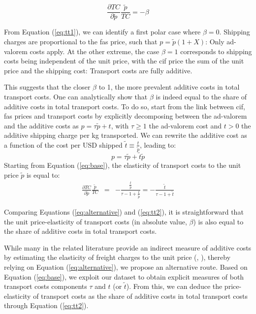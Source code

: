 \documentclass[a4paper,11pt]{article}
\begin{document}
\begin{equation}
\frac{\partial TC}{\partial \widetilde{p}} \frac{\widetilde{p}}{TC} = - \beta \label{eq:alternative}
\end{equation}

From Equation (\ref{eq:tt1}), we can identify a first polar case where $\beta=0$. Shipping charges are proportional to the fas price, such that $p=\widetilde{p}(1+X)$: Only ad-valorem costs apply. At the other extreme, the case $\beta=1$ corresponds to shipping costs being independent of the unit price, with the cif price the sum of the unit price and the shipping cost: Transport costs are fully additive.

This suggests that the closer $\beta$ to 1, the more prevalent additive costs in total transport costs. One can analytically show that $\beta$ is indeed equal to the share of additive costs in total transport costs. To do so, start from the link between cif, fas prices and transport costs by explicitly decomposing between the ad-valorem and the additive costs as $p = \tau \widetilde{p}+ t$, with $\tau \geq 1$ the ad-valorem cost and $t>0 $ the additive shipping charge per kg transported. We can rewrite the additive cost as a function of the cost per USD shipped $\widetilde{t} \equiv \frac{t}{\widetilde{p}}$, leading to:
\begin{equation}
p = \tau \widetilde{p}+ \widetilde{t}\widetilde{p}  \label{eq:base}
\end{equation}
Starting from Equation (\ref{eq:base}), the elasticity of transport costs to the unit price $\widetilde{p}$ is equal to:
\begin{eqnarray}
\frac{\partial TC}{\partial \widetilde{p}} \frac{\tilde{p}}{TC}&=& -\frac{\frac{t}{\tilde{p}}}{\tau -1  +\frac{t}{\tilde{p}}} = -\frac{\widetilde{t}}{\tau-1 +\widetilde{t}} \label{eq:tt2}
\end{eqnarray}

Comparing Equations (\ref{eq:alternative}) and (\ref{eq:tt2}), it is straightforward that the unit price-elasticity of transport costs (in absolute value, $\beta$) is also equal to the share of additive costs in total transport costs.

While many in the related literature provide an indirect measure of additive costs by estimating the elasticity of freight charges to the unit price (\citealp{hummels_skiba}, \citealp{Lashkaripour_JIE2020}), thereby relying on Equation (\ref{eq:alternative}), we propose an alternative route. Based on Equation (\ref{eq:base}), we exploit our dataset to obtain explicit measures of both transport costs components $\tau$ and $t$ (or $\widetilde{t}$). From this, we can deduce the price-elasticity of transport costs as the share of additive costs in total transport costs through Equation (\ref{eq:tt2}).
\end{document}

